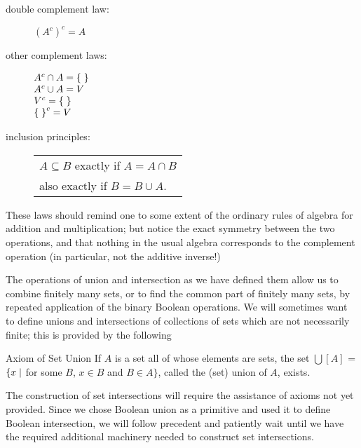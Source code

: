 \begin{description}
\item[\fdescr double complement law:]  $(A^c)^c = A$

\item[\fdescr other complement laws:]
  $\begin{array}[t]{@{}l}
    A^c \cap A = \vide\\ A^c \cup A = V\\ V^c = \vide\\ \vide^c = V
   \end{array}$

\item[\fdescr inclusion principles:]
  \begin{tabular}[t]{@{}l}
   $A \subseteq B$ exactly if $A = A \cap B$\\ 
   also exactly if $B = B \cup A$.
  \end{tabular}
\end{description} 

These laws should remind one to some extent of the ordinary rules of
algebra for addition and multiplication; but notice the exact symmetry
between the two operations, and that nothing in the usual algebra
corresponds to the complement operation (in particular, not
the additive inverse!)

The operations of union and
intersection as we have defined 
them allow us to combine finitely many sets, or to find the common
part of finitely many sets, by repeated application of the binary
Boolean operations.  We will sometimes want
to define unions and intersections of collections of sets which are not necessarily finite;
this is provided by the following

\begin{axiom}{Axiom of Set Union}
 If $A$ is a set all of whose elements are sets, the
 set $\bigcup[A]$ = $\{x \mid$ for some $B$, $x \in B$ and $B \in A\}$, called
 the (set) {\upshape union of $A$}, exists.
\end{axiom}

The construction of set intersections will require the
assistance of axioms not yet provided.  Since we chose Boolean union as a primitive and used it to define Boolean
intersection, we will follow precedent and patiently wait until we have the
required additional machinery needed to construct set intersections.


